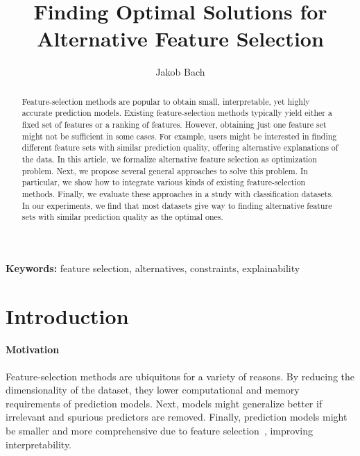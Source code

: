 \documentclass{article}
\title{Finding Optimal Solutions for Alternative Feature Selection}
\author{Jakob Bach}
\theoremstyle{definition}
\begin{document}
\maketitle

\begin{abstract}
Feature-selection methods are popular to obtain small, interpretable, yet highly accurate prediction models.
Existing feature-selection methods typically yield either a fixed set of features or a ranking of features.
However, obtaining just one feature set might not be sufficient in some cases.
For example, users might be interested in finding different feature sets with similar prediction quality, offering alternative explanations of the data.
In this article, we formalize alternative feature selection as optimization problem.
Next, we propose several general approaches to solve this problem.
In particular, we show how to integrate various kinds of existing feature-selection methods.
Finally, we evaluate these approaches in a study with classification datasets.
In our experiments, we find that most datasets give way to finding alternative feature sets with similar prediction quality as the optimal ones.
\end{abstract}

\textbf{Keywords:} feature selection, alternatives, constraints, explainability

\section{Introduction}
\label{sec:introduction}

\paragraph{Motivation}

Feature-selection methods are ubiquitous for a variety of reasons.
By reducing the dimensionality of the dataset, they lower computational and memory requirements of prediction models.
Next, models might generalize better if irrelevant and spurious predictors are removed.
Finally, prediction models might be smaller and more comprehensive due to feature selection~\cite{li2017feature}, improving interpretability.
\end{document}
